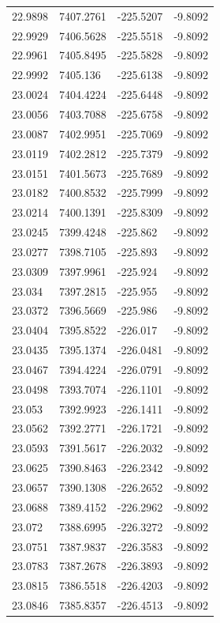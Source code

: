 \begin{table}[H]
\begin{tabular}{llll}
22.9898 & 7407.2761 & -225.5207 & -9.8092 \\
22.9929 & 7406.5628 & -225.5518 & -9.8092 \\
22.9961 & 7405.8495 & -225.5828 & -9.8092 \\
22.9992 & 7405.136 & -225.6138 & -9.8092 \\
23.0024 & 7404.4224 & -225.6448 & -9.8092 \\
23.0056 & 7403.7088 & -225.6758 & -9.8092 \\
23.0087 & 7402.9951 & -225.7069 & -9.8092 \\
23.0119 & 7402.2812 & -225.7379 & -9.8092 \\
23.0151 & 7401.5673 & -225.7689 & -9.8092 \\
23.0182 & 7400.8532 & -225.7999 & -9.8092 \\
23.0214 & 7400.1391 & -225.8309 & -9.8092 \\
23.0245 & 7399.4248 & -225.862 & -9.8092 \\
23.0277 & 7398.7105 & -225.893 & -9.8092 \\
23.0309 & 7397.9961 & -225.924 & -9.8092 \\
23.034 & 7397.2815 & -225.955 & -9.8092 \\
23.0372 & 7396.5669 & -225.986 & -9.8092 \\
23.0404 & 7395.8522 & -226.017 & -9.8092 \\
23.0435 & 7395.1374 & -226.0481 & -9.8092 \\
23.0467 & 7394.4224 & -226.0791 & -9.8092 \\
23.0498 & 7393.7074 & -226.1101 & -9.8092 \\
23.053 & 7392.9923 & -226.1411 & -9.8092 \\
23.0562 & 7392.2771 & -226.1721 & -9.8092 \\
23.0593 & 7391.5617 & -226.2032 & -9.8092 \\
23.0625 & 7390.8463 & -226.2342 & -9.8092 \\
23.0657 & 7390.1308 & -226.2652 & -9.8092 \\
23.0688 & 7389.4152 & -226.2962 & -9.8092 \\
23.072 & 7388.6995 & -226.3272 & -9.8092 \\
23.0751 & 7387.9837 & -226.3583 & -9.8092 \\
23.0783 & 7387.2678 & -226.3893 & -9.8092 \\
23.0815 & 7386.5518 & -226.4203 & -9.8092 \\
23.0846 & 7385.8357 & -226.4513 & -9.8092 \\

\end{tabular}
\end{table}

